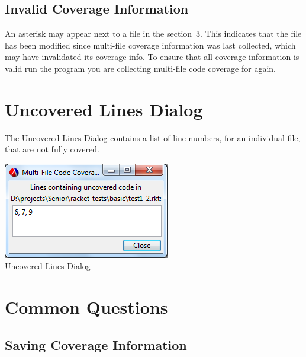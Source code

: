 \documentclass{article}
\newcommand{\sectionNewpage}{}
\newcommand{\ChapRef}[2]{\SecRef{#1}{#2}}
\newcommand{\SecRef}[2]{section~#1}
\newenvironment{SCentered}{\begin{trivlist}\item \centering}{\end{trivlist}}
\begin{document}
\subsection[Invalid Coverage Information]{Invalid Coverage Information}\label{t:x28part_x22Invalidx5fCoveragex5fInformationx22x29}

An asterisk may appear next to a file in the \ChapRef{3}{Covered Files Dialog}. This indicates that the file has been modified since multi{-}file coverage information was last collected, which may have invalidated its coverage info. To ensure that all coverage information is valid run the program you are collecting multi{-}file code coverage for again.

\sectionNewpage

\section[Uncovered Lines Dialog]{Uncovered Lines Dialog}\label{t:x28part_x22Uncovered_Lines_Dialogx22x29}

The Uncovered Lines Dialog contains a list of line numbers, for an individual file, that are not fully covered.

\begin{SCentered}\includegraphics[scale=1.0]{uncovered-lines-dialog.png}
\\
Uncovered Lines Dialog\end{SCentered}

\sectionNewpage

\section[Common Questions]{Common Questions}\label{t:x28part_x22Commonx5fQuestionsx22x29}



\subsection[Saving Coverage Information]{Saving Coverage Information}\label{t:x28part_x22Savingx5fCoveragex5fInformationx22x29}
\end{document}
